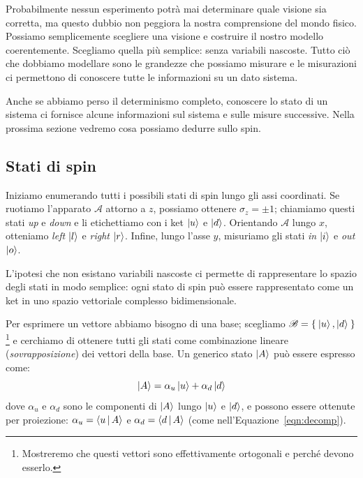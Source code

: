 Probabilmente nessun esperimento potrà mai determinare quale visione sia corretta, ma questo dubbio non peggiora la nostra comprensione del mondo fisico. Possiamo semplicemente scegliere una visione e costruire il nostro modello coerentemente. Scegliamo quella più semplice: senza variabili nascoste. Tutto ciò che dobbiamo modellare sono le grandezze che possiamo misurare e le misurazioni ci permettono di conoscere tutte le informazioni su un dato sistema.

Anche se abbiamo perso il determinismo completo, conoscere lo stato di un sistema ci fornisce alcune informazioni sul sistema e sulle misure successive. Nella prossima sezione vedremo cosa possiamo dedurre sullo spin.

\subsection{Stati di spin}
Iniziamo enumerando tutti i possibili stati di spin lungo gli assi coordinati. Se ruotiamo l'apparato $\mathcal{A}$ attorno a $z$, possiamo ottenere $\sigma_z = \pm 1$; chiamiamo questi stati \emph{up} e \emph{down} e li etichettiamo con i ket $\Ket{u}$ e $\Ket{d}$. Orientando $\mathcal{A}$ lungo $x$, otteniamo \emph{left} $\Ket{l}$ e \emph{right} $\Ket{r}$. Infine, lungo l'asse $y$, misuriamo gli stati \emph{in} $\Ket{i}$ e \emph{out} $\Ket{o}$.

L'ipotesi che non esistano variabili nascoste ci permette di rappresentare lo spazio degli stati in modo semplice: ogni stato di spin può essere rappresentato come un ket in uno spazio vettoriale complesso bidimensionale.

Per esprimere un vettore abbiamo bisogno di una base; scegliamo $\mathscr{B}=\Set{\Ket{u}, \Ket{d}}$\footnote{Mostreremo che questi vettori sono effettivamente ortogonali e perché devono esserlo.} e cerchiamo di ottenere tutti gli stati come combinazione lineare (\emph{sovrapposizione}) dei vettori della base. Un generico stato $\Ket{A}$ può essere espresso come:
\[
\Ket{A} = \alpha_u \Ket{u} + \alpha_d\Ket{d}
\]
dove $\alpha_u$ e $\alpha_d$ sono le componenti di $\Ket{A}$ lungo $\Ket{u}$ e $\Ket{d}$, e possono essere ottenute per proiezione: $\alpha_u = \Braket{u|A}$ e $\alpha_d = \Braket{d|A}$ (come nell'Equazione~\ref{eqn:decomp}).

